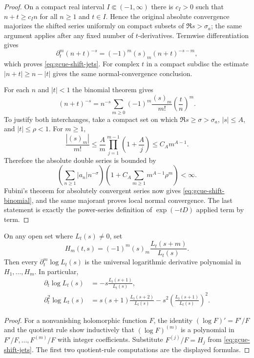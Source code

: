 \begin{proof}
On a compact real interval $I\Subset(-1,\infty)$ there is $c_I>0$ such that
$n+t\ge c_I n$ for all $n\ge1$ and $t\in I$.  Hence the original absolute convergence
majorizes the shifted series uniformly on compact subsets of $\Re s>\sigma_a$; the same
argument applies after any fixed number of $t$-derivatives.  Termwise differentiation gives
\[
 \partial_t^m(n+t)^{-s}=(-1)^m(s)_m(n+t)^{-s-m},
\]
which proves \eqref{eq:gcue-shift-jets}.  For complex $t$ in a compact subdisc the estimate
$|n+t|\ge n-|t|$ gives the same normal-convergence conclusion.

For each $n$ and $|t|<1$ the binomial theorem gives
\[
 (n+t)^{-s}=n^{-s}\sum_{m\ge0}(-1)^m\frac{(s)_m}{m!}\left(\frac tn\right)^m.
\]
To justify both interchanges, take a compact set on which
$\Re s\ge\sigma>\sigma_a$, $|s|\le A$, and $|t|\le\rho<1$.  For $m\ge1$,
\[
 \frac{|(s)_m|}{m!}
 \le \frac{A}{m}\prod_{j=1}^{m-1}\left(1+\frac Aj\right)
 \le C_A m^{A-1}.
\]
Therefore the absolute double series is bounded by
\[
 \left(\sum_{n\ge1}|a_n|n^{-\sigma}\right)
 \left(1+C_A\sum_{m\ge1}m^{A-1}\rho^m\right)<\infty.
\]
Fubini's theorem for absolutely convergent series now gives
\eqref{eq:gcue-shift-binomial}, and the same majorant proves local normal convergence.
The last statement is exactly the power-series definition of $\exp(-tD)$ applied term by
term.
\end{proof}

\begin{corollary}
\label{cor:gcue-log-jets}
On any open set where $L_t(s)\ne0$, set
\[
 H_m(t,s)=(-1)^m(s)_m\frac{L_t(s+m)}{L_t(s)}.
\]
Then every $\partial_t^m\log L_t(s)$ is the universal logarithmic derivative polynomial in
$H_1,\dots,H_m$.  In particular,
\begin{align*}
 \partial_t\log L_t(s)
 &=-s\frac{L_t(s+1)}{L_t(s)},\\
 \partial_t^2\log L_t(s)
 &=s(s+1)\frac{L_t(s+2)}{L_t(s)}
   -s^2\left(\frac{L_t(s+1)}{L_t(s)}\right)^2.
\end{align*}
\end{corollary}

\begin{proof}
For a nonvanishing holomorphic function $F$, the identity $(\log F)'=F'/F$ and the
quotient rule show inductively that $(\log F)^{(m)}$ is a polynomial in
$F'/F,\dots,F^{(m)}/F$ with integer coefficients.  Substitute
$F^{(j)}/F=H_j$ from \eqref{eq:gcue-shift-jets}.  The first two quotient-rule computations
are the displayed formulas.
\end{proof}

